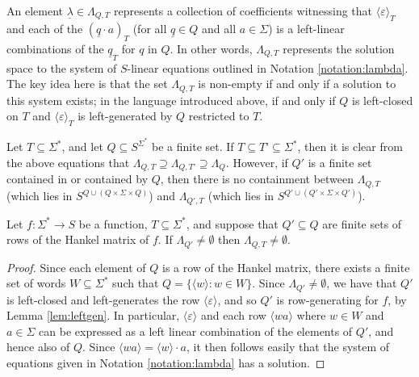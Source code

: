 \documentclass{lmcs}
\numberwithin{theorem}{section}
\begin{document}
\begin{rem}
\label{rem:lambda}
An element $\underline{\lambda} \in \Lambda_{Q,T}$ represents a collection of coefficients witnessing that $\langle \varepsilon \rangle_T$ and each of the $(\underline{q} \cdot a)_T$ (for all $\underline{q} \in Q$ and all $a \in \Sigma$) is a left-linear combinations of the $\underline{q}_T$ for $q$ in $Q$. In other words, $\Lambda_{Q, T}$ represents the solution space to the system of $S$-linear equations outlined in Notation \ref{notation:lambda}.
The key idea here is that the set $\Lambda_{Q, T}$ is non-empty if and only if a solution to this system exists; in the language introduced above, if and only if $Q$ is left-closed on $T$ and $\langle \varepsilon \rangle_T$ is left-generated by $Q$ restricted to $T$.
\end{rem}
\begin{rem}
\label{rem:subsets}
Let $T \subseteq \Sigma^*$, and let $Q \subseteq S^{\Sigma^*}$ be a finite set. If $T \subseteq T’ \subseteq \Sigma^*$, then it is clear from the above equations that $\Lambda_{Q, T} \supseteq \Lambda_{Q, T’}\supseteq \Lambda_{Q}$. However, if $Q'$ is a finite set contained in or contained by $Q$, then there is no containment between $\Lambda_{Q, T}$ (which lies in $S^{Q \cup (Q \times \Sigma \times Q)}$) and $\Lambda_{Q', T}$ (which lies in $S^{Q' \cup (Q' \times \Sigma \times Q')}$).
\end{rem}
\begin{lem}
\label{lem:Qincrement}
Let $f:\Sigma^* \rightarrow S$ be a function, $T \subseteq \Sigma^*$, and suppose that $Q' \subseteq Q$ are finite sets of rows of the Hankel matrix of $f$. If $\Lambda_{Q'} \neq \emptyset$ then $\Lambda_{Q, T} \neq \emptyset$.
\end{lem}
\begin{proof}
Since each element of $Q$ is a row of the Hankel matrix, there exists a finite set of words $W \subseteq \Sigma^*$ such that $Q = \{\langle w \rangle: w \in W\}$. Since $\Lambda_{Q'} \neq \emptyset$, we have that $Q'$ is left-closed and left-generates the row $\langle \varepsilon \rangle$, and so $Q'$ is row-generating for $f$, by Lemma \ref{lem:leftgen}. In particular, $\langle \varepsilon \rangle$ and each row $\langle wa \rangle$ where $w \in W$ and $a \in \Sigma$ can be expressed as a left linear combination of the elements of $Q'$, and hence also of $Q$. Since $\langle wa \rangle = \langle w \rangle \cdot a$, it then follows easily that the system of equations given in Notation \ref{notation:lambda} has a solution.
\end{proof}
\end{document}
